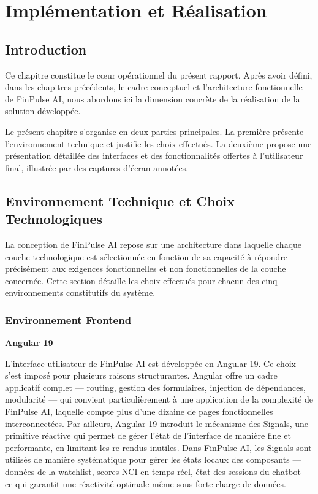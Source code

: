 \chapter{Implémentation et Réalisation}


\section{Introduction}

Ce chapitre constitue le cœur opérationnel du présent rapport. Après avoir défini, dans les chapitres précédents, le cadre conceptuel et l'architecture fonctionnelle de FinPulse AI, nous abordons ici la dimension concrète de la réalisation de la solution développée.

Le présent chapitre s'organise en deux parties principales. La première présente l'environnement technique et justifie les choix effectués. La deuxième propose une présentation détaillée des interfaces et des fonctionnalités offertes à l'utilisateur final, illustrée par des captures d'écran annotées.

\section{Environnement Technique et Choix Technologiques}

La conception de FinPulse AI repose sur une  architecture dans laquelle chaque couche technologique est sélectionnée en fonction de sa capacité à répondre précisément aux exigences fonctionnelles et non fonctionnelles de la couche concernée. Cette section détaille les choix effectués pour chacun des cinq environnements constitutifs du système.

\subsection{Environnement Frontend}

\textbf{Angular 19}

L'interface utilisateur de FinPulse AI est développée en Angular 19. Ce choix s'est imposé pour plusieurs raisons structurantes. Angular offre un cadre applicatif complet — routing, gestion des formulaires, injection de dépendances, modularité — qui convient particulièrement à une application de la complexité de FinPulse AI, laquelle compte plus d'une dizaine de pages fonctionnelles interconnectées. Par ailleurs, Angular 19 introduit le mécanisme des Signals, une primitive réactive qui permet de gérer l'état de l'interface de manière fine et performante, en limitant les re-rendus inutiles. Dans FinPulse AI, les Signals sont utilisés de manière systématique pour gérer les états locaux des composants — données de la watchlist, scores NCI en temps réel, état des sessions du chatbot — ce qui garantit une réactivité optimale même sous forte charge de données.

